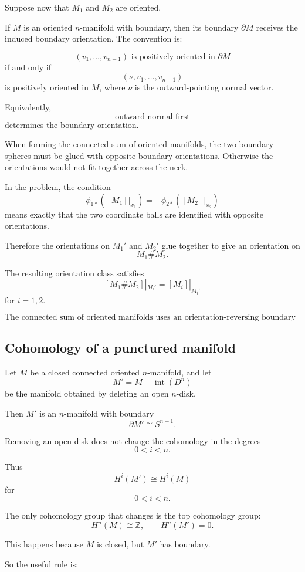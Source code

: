 \documentclass[12pt,a4paper]{article}
\theoremstyle{notespace}
\begin{document}
Suppose now that \(M_1\) and \(M_2\) are oriented.

If \(M\) is an oriented \(n\)-manifold with boundary, then its boundary
\(\partial M\) receives the induced boundary orientation. The convention is:

\[
(v_1,\dots,v_{n-1})
\text{ is positively oriented in } \partial M
\]
if and only if
\[
(\nu,v_1,\dots,v_{n-1})
\]
is positively oriented in \(M\), where \(\nu\) is the outward-pointing normal
vector.

Equivalently,
\[
\text{outward normal first}
\]
determines the boundary orientation.

When forming the connected sum of oriented manifolds, the two boundary spheres
must be glued with opposite boundary orientations. Otherwise the orientations
would not fit together across the neck.

In the problem, the condition
\[
\phi_{1*}([M_1]|_{x_1})
=
-\phi_{2*}([M_2]|_{x_2})
\]
means exactly that the two coordinate balls are identified with opposite
orientations.

Therefore the orientations on \(M_1'\) and \(M_2'\) glue together to give an
orientation on
\[
M_1\#M_2.
\]

The resulting orientation class satisfies
\[
[M_1\#M_2]|_{M_i'}
=
[M_i]|_{M_i'}
\]
for \(i=1,2\).

\[
\boxed{
	\text{The connected sum of oriented manifolds uses an orientation-reversing
		boundary identification.}
}
\]

\subsection{Cohomology of a punctured manifold}

Let \(M\) be a closed connected oriented \(n\)-manifold, and let
\[
M'=M-\operatorname{int}(D^n)
\]
be the manifold obtained by deleting an open \(n\)-disk.

Then \(M'\) is an \(n\)-manifold with boundary
\[
\partial M'\cong S^{n-1}.
\]

Removing an open disk does not change the cohomology in the degrees
\[
0<i<n.
\]

Thus
\[
H^i(M')\cong H^i(M)
\]
for
\[
0<i<n.
\]

The only cohomology group that changes is the top cohomology group:
\[
H^n(M)\cong \mathbb{Z},
\qquad
H^n(M')=0.
\]

This happens because \(M\) is closed, but \(M'\) has boundary.

So the useful rule is:
\end{document}
